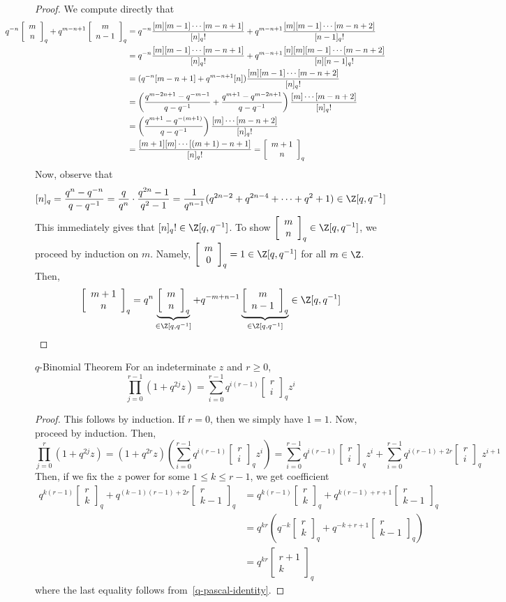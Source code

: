 \documentclass[11pt,leqno,oneside]{amsbook}
\numberwithin{thm}{section}
\newcommand{\qfactorial}[1]{[#1]_q!}
\newcommand{\qbinom}[3][q]{\left[\begin{array}{c}#2\\#3\end{array}\right]_{#1}}
\begin{document}
\begin{proof}
  We compute directly that
  \begin{align*}
     \hspace{-0.5in} q^{-n}\qbinom{m}{n}+q^{m-n+1}\qbinom{m}{n-1}
    & =
    q^{-n}\frac{[m][m-1]\cdots[m-n+1]}{\qfactorial{n}} +
      q^{m-n+1}\frac{[m][m-1]\cdots [m-n+2]}{\qfactorial{n-1}}
      \\
    & =
    q^{-n}\frac{[m][m-1]\cdots[m-n+1]}{\qfactorial{n}} +
    q^{m-n+1}\frac{[n][m][m-1]\cdots [m-n+2]}{[n]\qfactorial{n-1}}\\
    & = (q^{-n}[m-n+1] +
    q^{m-n+1}[n])\frac{[m][m-1]\cdots[m-n+2]}{\qfactorial{n}}\\
    & =
      \left(\frac{q^{m-2n+1}-q^{-m-1}}{q-q^{-1}}+\frac{q^{m+1}-q^{m-2n+1}}{q-q^{-1}}\right)\frac{[m]\cdots[m-n+2]}{\qfactorial{n}}
    \\
    & =
      \left(\frac{q^{m+1}-q^{-(m+1)}}{q-q^{-1}}\right)\frac{[m]\cdots[m-n+2]}{\qfactorial{n}}
    \\
    & = \frac{[m+1][m] \cdots [(m+1)-n+1]}{\qfactorial{n}} = \qbinom{m+1}{n}
  \end{align*}
  Now, observe that \[
    [n]_q = \frac{q^n-q^{-n}}{q-q^{-1}} = \frac{q}{q^n}\cdot
    \frac{q^{2n}-1}{q^2-1} =
    \frac{1}{q^{n-1}}(q^{2n-2}+q^{2n-4}+\cdots+q^2+1) \in \Z[q,q^{-1}]
  \]
  This immediately gives that \(\qfactorial{n} \in \Z[q,q^{-1}]\). To
  show \(\qbinom{m}{n} \in \Z[q,q^{-1}]\), we proceed by
  induction on \(m\). Namely, \(\qbinom{m}{0} = 1 \in \Z[q,q^{-1}]\) for all
  \(m \in \Z\). Then, \[
    \qbinom{m+1}{n} = q^{n}\underbrace{\qbinom{m}{n}}_{\in
      \Z[q,q^{-1}]} + q^{-m+n-1}\underbrace{\qbinom{m}{n-1}}_{\in
      \Z[q,q^{-1}]} \in \Z[q,q^{-1}]
  \]
\end{proof}
\begin{thm}{\(q\)-Binomial Theorem}\label{q-binomial-theorem}
  For an indeterminate \(z\) and \(r \geq 0\), 
  \[
    \prod_{j=0}^{r-1} (1+q^{2j}z) = \sum_{i=0}^{r-1} q^{i(r-1)}
    \qbinom{r}{i} z^i
  \]
\end{thm}
\begin{proof}
  This follows by induction. If \(r = 0\), then we simply have \(1 =
  1\). Now, proceed by induction. Then, \[
    \prod_{j=0}^r (1+q^{2j}z) = (1+q^{2r}z)\left( \sum_{i=0}^{r-1}
      q^{i(r-1)} \qbinom{r}{i} z^i \right) = \sum_{i=0}^{r-1}
      q^{i(r-1)} \qbinom{r}{i} z^i + \sum_{i=0}^{r-1} q^{i(r-1)+2r} \qbinom{r}{i}z^{i+1}
  \]
  Then, if we fix the \(z\) power for some \(1 \leq k \leq r-1\), we
  get coefficient
  \begin{align*}
    q^{k(r-1)} \qbinom{r}{k} + q^{(k-1)(r-1)+2r} \qbinom{r}{k-1}
    & =
      q^{k(r-1)} \qbinom{r}{k} + q^{k(r-1)+r+1} \qbinom{r}{k-1} \\
    & = q^{kr}
      \left( q^{-k} \qbinom{r}{k} + q^{-k+r+1} \qbinom{r}{k-1}\right) \\
    & = q^{kr} \qbinom{r+1}{k}
  \end{align*}
  where the last equality follows from~\ref{q-pascal-identity}.
\end{proof}
\end{document}
